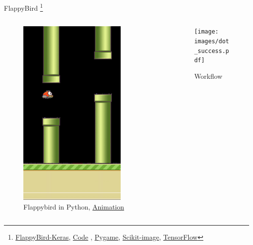 \documentclass[presentation]{beamer}
\begin{document}
\begin{frame}[label={sec:org9d5fe0c}]{FlappyBird      \footnote{\href{https://yanpanlau.github.io/2016/07/10/FlappyBird-Keras.html}{ FlappyBird-Keras}, \href{https://github.com/yanpanlau/Keras-FlappyBird/blob/master/qlearn.py}{Code} , \href{https://www.pygame.org/wiki/about}{Pygame}, \href{https://scikit-image.org/}{Scikit-image}, \href{https://www.tensorflow.org/}{TensorFlow}}}
\begin{columns}
\begin{column}[c]{0.35\columnwidth}
\footnotesize
\begin{figure}[htbp]
\centering
\includegraphics[width=0.8\textwidth]{images/flappybird-0.png}
\caption{Flappybird in Python, \href{images/flappybird.gif}{Animation}}
\end{figure}
\end{column}

\begin{column}[c]{0.75\columnwidth}
\begin{figure}[htbp]
\centering
\texttt{[image: images/dot\_success.pdf]}
\caption{Workflow}
\end{figure}
\end{column}
\end{columns}
\end{frame}
\end{document}
